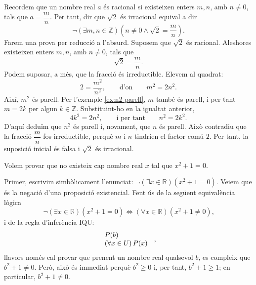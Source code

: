 \begin{solucio}
Recordem que un nombre real $a$ és racional si existeixen enters $m,n$, amb
$n\neq0$, tals que $a=\dfrac{m}{n}$. Per tant, dir que $\sqrt{2}$ és
irracional equival a dir
\begin{equation*}
\lnot\left(\exists m,n\in\mathbb{Z}\right)
\left(n\neq0\wedge \sqrt{2}=\frac{m}{n}\right).
\end{equation*}
Farem una prova per reducció a l'absurd. Suposem que $\sqrt{2}$ és racional.
Aleshores existeixen enters $m,n$, amb $n\neq0$, tals que
\[
\sqrt{2}=\frac{m}{n}.
\]
Podem suposar, a més, que la fracció és irreductible. Elevem al quadrat:
\[
2=\frac{m^{2}}{n^{2}}, \qquad \text{d'on} \qquad m^{2}=2n^{2}.
\]
Així, $m^{2}$ és parell. Per l'exemple \ref{ex:n2-parell}, $m$ també és
parell, i per tant $m=2k$ per algun $k\in\mathbb{Z}$. Substituint-ho en la
igualtat anterior,
\[
4k^{2}=2n^{2}, \qquad \text{i per tant} \qquad n^{2}=2k^{2}.
\]
D'aquí deduïm que $n^{2}$ és parell i, novament, que $n$ és parell. Això
contradiu que la fracció $\dfrac{m}{n}$ fos irreductible, perquè $m$ i $n$
tindrien el factor comú $2$. Per tant, la suposició inicial és falsa i
$\sqrt{2}$ és irracional.
\end{solucio}

\begin{exemple}
Volem provar que no existeix cap nombre real $x$ tal que $x^{2}+1=0$.
\end{exemple}

\begin{solucio}
Primer, escrivim simbòlicament l'enunciat: $\lnot\left( \exists x\in\mathbb{R}\right) \left( x^{2}+1=0\right).$ Veiem que és la negació
d'una proposició existencial. Fent ús de la següent equivalència lògica\begin{equation*}
\lnot\left( \exists x\in\mathbb{R}\right) \left( x^{2}+1=0\right)
\Longleftrightarrow\left( \forall x\in\mathbb{R}\right) \left(
x^{2}+1\neq0\right) \text{,}
\end{equation*}
i de la regla d'inferència IQU:\begin{equation*}
\begin{tabular}{l}
$P(b)$ \\
$\left( \forall x\in U\right) P(x)$\end{tabular}
\ \text{,}
\end{equation*}
llavors només cal provar que prenent un nombre real qualsevol $b$, es
compleix que $b^{2}+1\neq0$. Però, això és immediat perquè $b^{2}\geq0$ i, per tant, $b^{2}+1\geq1$; en particular, $b^{2}+1\neq0$.
\end{solucio}

